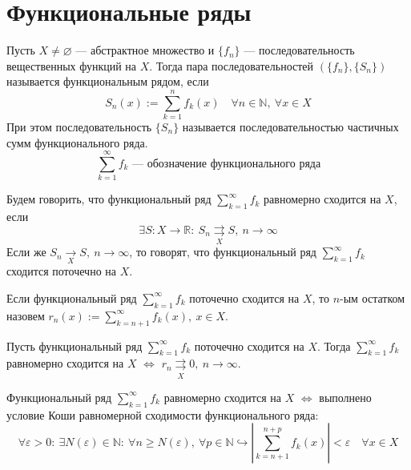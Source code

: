 \documentclass[11pt]{article}
\begin{document}
\section{Функциональные ряды}

\begin{definition}
    Пусть $X \neq \varnothing$ --- абстрактное множество и $\{f_n\}$ --- последовательность вещественных функций на $X$. Тогда пара последовательностей $\left(\{f_n\}, \{S_n\}\right)$
    называется функциональным рядом, если \[S_n(x) := \sum_{k = 1}^{n} f_k(x) \quad \forall n \in \mathbb{N}, \ \forall x \in X\] При этом последовательность $\{S_n\}$ 
    называется последовательностью частичных сумм функционального ряда. \[\sum_{k = 1}^{\infty} f_k \text{ --- обозначение функционального ряда}\]
\end{definition}

\begin{definition}
    Будем говорить, что функциональный ряд $\displaystyle \sum_{k = 1}^{\infty} f_k$ равномерно сходится на $X$, если \[\exists S: X \to \mathbb{R}: \ S_n \underset{X}{\rightrightarrows}
    S, \ n \to \infty\]
    Если же $S_n \underset{X}{\rightarrow} S, \ n \to \infty$, то говорят, что функциональный ряд $\displaystyle \sum_{k = 1}^{\infty} f_k$ сходится поточечно на $X$.
\end{definition}
    
\begin{definition}
    Если функциональный ряд $\displaystyle \sum_{k = 1}^{\infty} f_k$ поточечно сходится на $X$, то $n$-ым остатком назовем $\displaystyle r_n(x) := \sum_{k = n + 1}^{\infty}
    f_k(x), \ x \in X$.
\end{definition}

\begin{theorem} \label{theorem:3.1}
    Пусть функциональный ряд $\displaystyle \sum_{k = 1}^{\infty} f_k$ поточечно сходится на $X$. Тогда $\displaystyle \sum_{k = 1}^{\infty} f_k$ равномерно сходится на $X$
    $\Longleftrightarrow$ $r_n \underset{X}{\rightrightarrows} 0, \ n \to \infty$.
\end{theorem}

\begin{theorem}
    Функциональный ряд $\displaystyle \sum_{k = 1}^{\infty} f_k$ равномерно сходится на $X$ $\Longleftrightarrow$ выполнено условие Коши равномерной сходимости функционального 
    ряда: \[\forall \varepsilon > 0: \ \exists N(\varepsilon) \in \mathbb{N}: \ \forall n \geq N(\varepsilon), \ \forall p \in \mathbb{N} \hookrightarrow \left|\sum_{k = n + 1}^{n + p}
    f_k(x)\right| < \varepsilon \quad \forall x \in X\]
\end{theorem}
\end{document}
